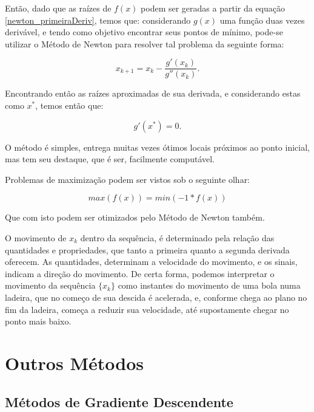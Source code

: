 
Então, dado que as raízes de $f(x)$ podem ser geradas a partir da equação
\ref{newton_primeiraDeriv}, temos que: considerando $g(x)$ uma função duas vezes
derivável, e tendo como objetivo encontrar seus pontos de mínimo, pode-se
utilizar o Método de Newton para resolver tal problema da seguinte forma:

\begin{equation}
    x_{k+1} = x_{k} - \frac {g'(x_{k})}{g''(x_{k})}.
\end{equation}

Encontrando então as raízes aproximadas de sua derivada, e considerando
estas como  $x^*$, temos então que:

\begin{equation}
    g'(x^*) = 0.
\end{equation}

O método é simples, entrega muitas vezes ótimos locais próximos ao ponto
inicial, mas tem seu destaque, que é ser, facilmente computável.

Problemas de maximização podem ser vistos sob o seguinte olhar:

\begin{equation}
    max(f(x)) = min(-1 * f(x))
\end{equation}

Que com isto podem ser otimizados pelo Método de Newton também.

O movimento de \(x_k\) dentro da sequência, é determinado pela relação das
quantidades e propriedades, que tanto a primeira quanto a segunda derivada
oferecem. As quantidades, determinam a velocidade do movimento, e os sinais,
indicam a direção do movimento. De certa forma, podemos interpretar o movimento
da sequência \(\{x_k\}\) como instantes do movimento de uma bola numa ladeira,
que no começo de sua descida é acelerada, e, conforme chega ao plano no fim da
ladeira, começa a reduzir sua velocidade, até supostamente chegar no ponto mais
baixo.


\section{{Outros Métodos}}

\subsection{Métodos de Gradiente Descendente}

